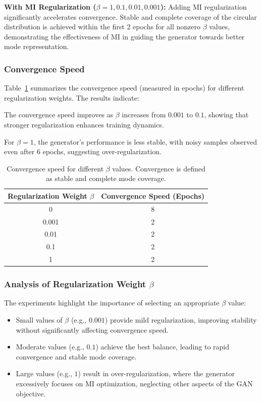 \documentclass[lettersize,journal]{IEEEtran}
\begin{document}
    \textbf{With MI Regularization (\( \beta = 1, 0.1, 0.01, 0.001 \)):} Adding MI regularization significantly accelerates convergence. Stable and complete coverage of the circular distribution is achieved within the first 2 epochs for all nonzero \( \beta \) values, demonstrating the effectiveness of MI in guiding the generator towards better mode representation.

\subsubsection{Convergence Speed}
Table~\ref{tab:circular_convergence} summarizes the convergence speed (measured in epochs) for different regularization weights. The results indicate:

The convergence speed improves as \( \beta \) increases from \( 0.001 \) to \( 0.1 \), showing that stronger regularization enhances training dynamics.

For \( \beta = 1 \), the generator's performance is less stable, with noisy samples observed even after 6 epochs, suggesting over-regularization.
\begin{table}[h]
    \centering
    \begin{tabular}{c|c}
        \hline
        \textbf{Regularization Weight \( \beta \)} & \textbf{Convergence Speed (Epochs)} \\
        \hline
        0 & 8 \\
        0.001 & 2 \\
        0.01 & 2 \\
        0.1 & 2 \\
        1 & 2 \\
        \hline
    \end{tabular}
    \caption{Convergence speed for different \( \beta \) values. Convergence is defined as stable and complete mode coverage.}
    \label{tab:circular_convergence}
\end{table}

\subsubsection{Analysis of Regularization Weight \( \beta \)}
The experiments highlight the importance of selecting an appropriate \( \beta \) value:
\begin{itemize}
    \item Small values of \( \beta \) (e.g., \( 0.001 \)) provide mild regularization, improving stability without significantly affecting convergence speed.
    \item Moderate values (e.g., \( 0.1 \)) achieve the best balance, leading to rapid convergence and stable mode coverage.
    \item Large values (e.g., \( 1 \)) result in over-regularization, where the generator excessively focuses on MI optimization, neglecting other aspects of the GAN objective.
\end{itemize}
\end{document}
